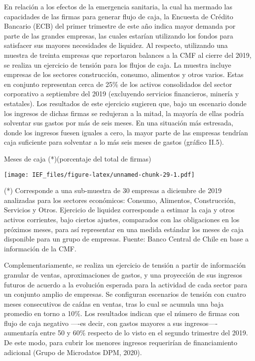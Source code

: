 \documentclass[
]{book}
\begin{document}
En relación a los efectos de la emergencia sanitaria, la cual ha mermado las
capacidades de las firmas para generar flujo de caja, la Encuesta de Crédito
Bancario (ECB) del primer trimestre de este año indica mayor demanda por
parte de las grandes empresas, las cuales estarían utilizando los fondos para
satisfacer sus mayores necesidades de liquidez. Al respecto, utilizando una
muestra de treinta empresas que reportaron balances a la CMF al cierre del
2019, se realiza un ejercicio de tensión para los flujos de caja. La muestra
incluye empresas de los sectores construcción, consumo, alimentos y otros
varios. Estas en conjunto representan cerca de 25\% de los activos consolidados
del sector corporativo a septiembre del 2019 (excluyendo servicios financieros,
minería y estatales). Los resultados de este ejercicio sugieren que, bajo un
escenario donde los ingresos de dichas firmas se redujeran a la mitad, la
mayoría de ellas podría solventar sus gastos por más de seis meses. En una
situación más estresada, donde los ingresos fuesen iguales a cero, la mayor
parte de las empresas tendrían caja suficiente para solventar a lo más seis
meses de gastos (gráfico II.5).

Meses de caja (*)(porcentaje del total de firmas)

\texttt{[image: IEF\_files/figure-latex/unnamed-chunk-29-1.pdf]}

(*) Corresponde a una sub-muestra de 30 empresas a diciembre de 2019 analizadas para los sectores económicos: Consumo, Alimentos, Construcción, Servicios y Otros. Ejercicio de liquidez corresponde a estimar la caja y otros activos corrientes, bajo ciertos ajustes, comparados con las obligaciones en los próximos meses, para así representar en una medida estándar los meses de caja disponible para un grupo de empresas.
Fuente: Banco Central de Chile en base a información de la CMF.

Complementariamente, se realiza un ejercicio de tensión a partir de información
granular de ventas, aproximaciones de gastos, y una proyección de sus ingresos
futuros de acuerdo a la evolución esperada para la actividad de cada sector
para un conjunto amplio de empresas. Se configuran escenarios de tensión
con cuatro meses consecutivos de caídas en ventas, tras lo cual se acumula
una baja promedio en torno a 10\%. Los resultados indican que el número
de firmas con flujo de caja negativo ----es decir, con gastos mayores a sus
ingresos---- aumentaría entre 50 y 60\% respecto de lo visto en el segundo
trimestre del 2019. De este modo, para cubrir los menores ingresos requerirían
de financiamiento adicional (Grupo de Microdatos DPM, 2020).
\end{document}
